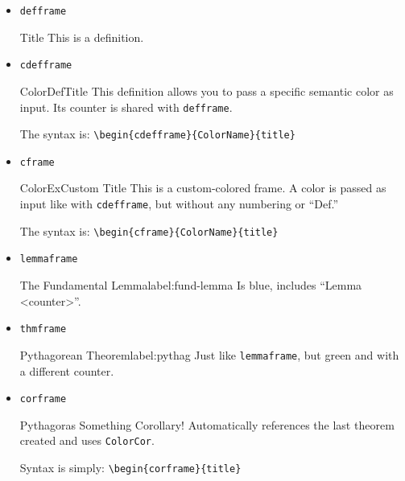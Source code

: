 \documentclass[a4paper,12pt]{report}
\begin{document}
\begin{itemize}
        \item \texttt{defframe}
        \begin{defframe}{Title}{}
            This is a definition.
        \end{defframe}

    \item \texttt{cdefframe}
        \begin{cdefframe}{ColorDef}{Title}
            This definition allows you to pass a specific semantic color as input. Its counter is shared with \texttt{defframe}.

            The syntax is: \texttt{\textbackslash begin\{cdefframe\}\{ColorName\}\{title\}}
        \end{cdefframe}

    \item \texttt{cframe}
        \begin{cframe}{ColorEx}{Custom Title}
            This is a custom-colored frame. A color is passed as input like with \texttt{cdefframe}, but without any numbering or ``Def.''
            
            The syntax is: \texttt{\textbackslash begin\{cframe\}\{ColorName\}\{title\}}
        \end{cframe}

    \item \texttt{lemmaframe}

        \begin{lemmaframe}{The Fundamental Lemma}{label:fund-lemma}
            Is blue, includes ``Lemma <counter>''.
        \end{lemmaframe}

    \item \texttt{thmframe}

        \begin{thmframe}{Pythagorean Theorem}{label:pythag}
            Just like \texttt{lemmaframe}, but green and with a different counter.
        \end{thmframe}


    \item \texttt{corframe}
        \begin{corframe}{Pythagoras Something}
            Corollary! Automatically references the last theorem created and uses \texttt{ColorCor}.
            
            Syntax is simply: \texttt{\textbackslash begin\{corframe\}\{title\}}
        \end{corframe}


\end{itemize}
\end{document}
